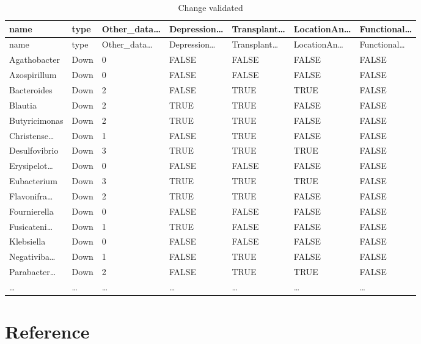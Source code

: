 \documentclass[
]{article}
\begin{document}
\begin{longtable}[]{@{}lllllll@{}}
\caption{\label{tab:change-validated}Change validated}\tabularnewline
\toprule
name & type & Other\_data\ldots{} & Depression\ldots{} & Transplant\ldots{} & LocationAn\ldots{} & Functional\ldots{}\tabularnewline
\midrule
\endfirsthead
\toprule
name & type & Other\_data\ldots{} & Depression\ldots{} & Transplant\ldots{} & LocationAn\ldots{} & Functional\ldots{}\tabularnewline
\midrule
\endhead
Agathobacter & Down & 0 & FALSE & FALSE & FALSE & FALSE\tabularnewline
Azospirillum & Down & 0 & FALSE & FALSE & FALSE & FALSE\tabularnewline
Bacteroides & Down & 2 & FALSE & TRUE & TRUE & FALSE\tabularnewline
Blautia & Down & 2 & TRUE & TRUE & FALSE & FALSE\tabularnewline
Butyricimonas & Down & 2 & TRUE & TRUE & FALSE & FALSE\tabularnewline
Christense\ldots{} & Down & 1 & FALSE & TRUE & FALSE & FALSE\tabularnewline
Desulfovibrio & Down & 3 & TRUE & TRUE & TRUE & FALSE\tabularnewline
Erysipelot\ldots{} & Down & 0 & FALSE & FALSE & FALSE & FALSE\tabularnewline
Eubacterium & Down & 3 & TRUE & TRUE & TRUE & FALSE\tabularnewline
Flavonifra\ldots{} & Down & 2 & TRUE & TRUE & FALSE & FALSE\tabularnewline
Fournierella & Down & 0 & FALSE & FALSE & FALSE & FALSE\tabularnewline
Fusicateni\ldots{} & Down & 1 & TRUE & FALSE & FALSE & FALSE\tabularnewline
Klebsiella & Down & 0 & FALSE & FALSE & FALSE & FALSE\tabularnewline
Negativiba\ldots{} & Down & 1 & FALSE & TRUE & FALSE & FALSE\tabularnewline
Parabacter\ldots{} & Down & 2 & FALSE & TRUE & TRUE & FALSE\tabularnewline
\ldots{} & \ldots{} & \ldots{} & \ldots{} & \ldots{} & \ldots{} & \ldots{}\tabularnewline
\bottomrule
\end{longtable}

\hypertarget{bibliography}{%
\section*{Reference}\label{bibliography}}
\end{document}
